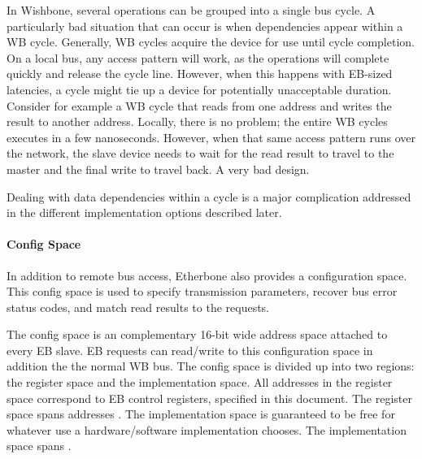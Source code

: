 \vspace{5 mm}

\noindent In Wishbone, several operations can be grouped into a single bus cycle.
A particularly bad situation that can occur is when dependencies appear within a WB cycle. 
Generally, WB cycles acquire the device for use until cycle completion. 
On a local bus, any access pattern will work, as the operations will complete quickly and release the cycle line. 
However, when this happens with EB-sized latencies, a cycle might tie up a device for potentially unacceptable duration. 
Consider for example a WB cycle that reads from one address and writes the result to another address.
Locally, there is no problem; the entire WB cycles executes in a few nanoseconds. 
However, when that same access pattern runs over the network, the slave device needs to wait for the read result to travel to the master and the final write to travel back. 
A very bad design.

\vspace{5 mm}

\noindent Dealing with data dependencies within a cycle is a major complication addressed in the different implementation options described later.

\paragraph{Config Space}

In addition to remote bus access, Etherbone also provides a configuration space. 
This config space is used to specify transmission parameters, recover bus error status codes, and match read results to the requests.

\vspace{5 mm}

\noindent The config space is an complementary 16-bit wide address space attached to every EB slave. 
EB requests can read/write to this configuration space in addition the the normal WB bus. 
The config space is divided up into two regions: the register space and the implementation space. 
All addresses in the register space correspond to EB control registers, specified in this document. 
The register space spans addresses . 
The implementation space is guaranteed to be free for whatever use a hardware/software implementation chooses. 
The implementation space spans .

\vspace{5 mm}

